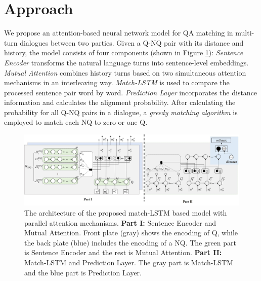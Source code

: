 \section{Approach}
\label{sec:method}

We propose an attention-based neural network model for QA matching 
in multi-turn dialogues between two parties. 
Given a Q-NQ pair with its distance and history, 
the model consists of four components (shown in Figure \ref{fig:model1}): 
\textit{Sentence Encoder} transforms the natural language turns into 
sentence-level embeddings. \textit{Mutual Attention} combines history turns 
based on two simultaneous attention mechanisms in an interleaving way. 
\textit{Match-LSTM} is used to compare the processed sentence pair word by word. 
\textit{Prediction Layer} incorporates the distance information 
and calculates the alignment probability. After calculating the probability for 
all Q-NQ pairs in a dialogue, a \textit{greedy matching algorithm} is employed to
match each NQ to zero or one Q.


\begin{figure}
	\centering
	\includegraphics[scale=0.40]{pictures/figure3_new.pdf}
	\caption{The architecture of the proposed match-LSTM based model with parallel attention mechanisms. \textbf{Part I:} Sentence Encoder and Mutual Attention. Front plate
(gray) shows the encoding of Q, while the back plate (blue) includes the encoding of a NQ.
The green part is Sentence Encoder and the rest is Mutual Attention. \textbf{Part II:} Match-LSTM and Prediction Layer. The gray part is Match-LSTM and the blue part is Prediction Layer.}
	
	\label{fig:model1}
\end{figure}

